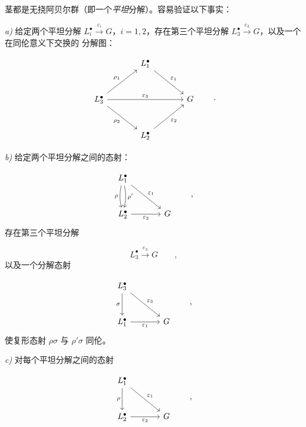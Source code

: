 \clearpage
{}
茎都是无挠阿贝尔群（即一个\emph{平坦}分解）。容易验证以下事实：

\noindent\emph{a)} 给定两个平坦分解
$L_i^{\bullet}\xrightarrow{\varepsilon_i}G$，$i=1,2$，存在第三个平坦分解
$L_3^{\bullet}\xrightarrow{\varepsilon_3}G$，以及一个在同伦意义下交换的
分解图：

\[
\begin{tikzcd}[column sep=large,row sep=large]
  & L_1^{\bullet} \arrow[dr,"\varepsilon_1"] & \\
L_3^{\bullet} \arrow[ur,"\rho_1"] \arrow[rr,"\varepsilon_3"]
  \arrow[dr,"\rho_2"'] && G \\
  & L_2^{\bullet} \arrow[ur,"\varepsilon_2"'] &
\end{tikzcd}
\qquad\text{.}
\]

\noindent\emph{b)} 给定两个平坦分解之间的态射：

\[
\begin{tikzcd}[column sep=large,row sep=large]
L_1^{\bullet}
  \arrow[d,bend right=12,"\rho"']
  \arrow[d,bend left=12,"\rho'"]
  \arrow[dr,"\varepsilon_1"] & \\
L_2^{\bullet} \arrow[r,"\varepsilon_2"'] & G
\end{tikzcd}
\qquad\text{,}
\]
存在第三个平坦分解

\[
L_3^{\bullet}\xrightarrow{\varepsilon_3}G
\qquad\text{,}
\]
以及一个分解态射

\[
\begin{tikzcd}[column sep=large,row sep=large]
L_3^{\bullet} \arrow[d,"\sigma"'] \arrow[dr,"\varepsilon_3"] & \\
L_1^{\bullet} \arrow[r,"\varepsilon_1"'] & G
\end{tikzcd}
\qquad\text{,}
\]
使复形态射 $\rho\sigma$ 与 $\rho'\sigma$ 同伦。

\noindent\emph{c)} 对每个平坦分解之间的态射

\[
\begin{tikzcd}[column sep=large,row sep=large]
L_1^{\bullet} \arrow[d,"\rho"'] \arrow[dr,"\varepsilon_1"] & \\
L_2^{\bullet} \arrow[r,"\varepsilon_2"'] & G
\end{tikzcd}
\qquad\text{,}
\]
